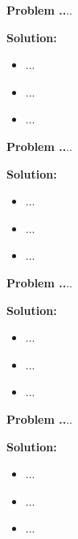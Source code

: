 \documentclass{article}
\theoremstyle{problemstyle}
\newenvironment{boxedproblem}[1]
{\begin{tcolorbox}[colback=white, colframe=black, boxrule=0.5pt]\noindent\textbf{Problem #1.}}
{\end{tcolorbox}}
\begin{document}
    
    \begin{boxedproblem}{12}
    ...
    \end{boxedproblem}
    
    \textbf{Solution:}
    \begin{itemize}[label={},leftmargin=1.25cm,nosep]
        \item ...
        \item ...
        \item ...
    \end{itemize}
    
    
    \begin{boxedproblem}{13}
    ...
    \end{boxedproblem}
    
    \textbf{Solution:}
    \begin{itemize}[label={},leftmargin=1.25cm,nosep]
        \item ...
        \item ...
        \item ...
    \end{itemize}
    
    
    \begin{boxedproblem}{14}
    ...
    \end{boxedproblem}
    
    \textbf{Solution:}
    \begin{itemize}[label={},leftmargin=1.25cm,nosep]
        \item ...
        \item ...
        \item ...
    \end{itemize}
    
    
    \begin{boxedproblem}{15}
    ...
    \end{boxedproblem}
    
    \textbf{Solution:}
    \begin{itemize}[label={},leftmargin=1.25cm,nosep]
        \item ...
        \item ...
        \item ...
    \end{itemize}
    
\end{document}
